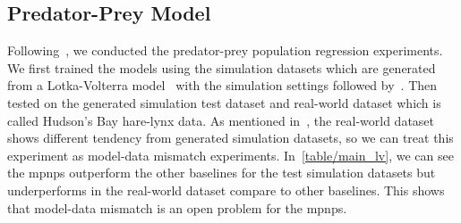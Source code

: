 
\subsection{Predator-Prey Model}
\label{main:subsec:predator-prey}
Following~\citet{lee2020bootstrapping}, we conducted the predator-prey population regression experiments. We first trained the models using the simulation datasets which are generated from a Lotka-Volterra model~\citep{wilkinson2018stochastic} with the simulation settings followed by~\citet{lee2020bootstrapping}. Then tested on the generated simulation test dataset and real-world dataset which is called Hudson's Bay hare-lynx data. As mentioned in~\citet{lee2020bootstrapping}, the real-world dataset shows different tendency from generated simulation datasets, so we can treat this experiment as model-data mismatch experiments. In~\cref{table/main_lv}, we can see the \glspl{mpnp} outperform the other baselines for the test simulation datasets but underperforms in the real-world dataset compare to other baselines. This shows that model-data mismatch is an open problem for the \glspl{mpnp}.



